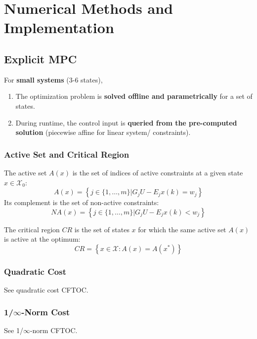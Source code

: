 \section{Numerical Methods and Implementation}
\subsection{Explicit MPC}
For \textbf{small systems} (3-6 states),
\begin{enumerate}
    \item The optimization problem is \textbf{solved offline and parametrically} for a set of states.
    \item During runtime, the control input is \textbf{queried from the pre-computed solution} (piecewise affine for linear system/ constraints).
\end{enumerate}

\subsubsection{Active Set and Critical Region}

The active set $A(x)$ is the set of indices of active constraints at a given state $x\in \mathcal{X}_0$:
\begin{equation*}
    A(x) = \left\{ j \in \{1,\ldots,m\} \Big| G_j U - E_j x(k) = w_j \right\}
\end{equation*}
Its complement is the set of non-active constraints:
\begin{equation*}
    NA(x) = \left\{ j \in \{1,\ldots,m\} \Big| G_j U - E_j x(k) < w_j \right\}
\end{equation*}

\newpar{}

The critical region $CR$ is the set of states $x$ for which the same active set $A(x)$ is active at the optimum:
\begin{equation*}
    CR = \left\{x\in \mathcal{X} : A(x)=A(x^*)\right\}
\end{equation*}

\subsubsection{Quadratic Cost}
See quadratic cost CFTOC.

\subsubsection[1/inf-Norm Cost]{1/$\infty$-Norm Cost}
See 1/$\infty$-norm CFTOC.

